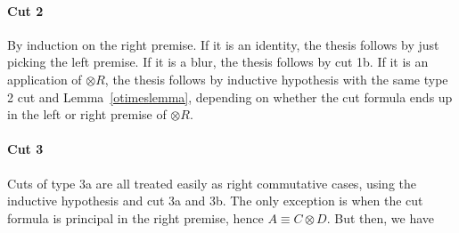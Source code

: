 
\paragraph{Cut 2}

By induction on the right premise. If it is an identity, the thesis follows by
just picking the left premise. If it is a blur, the thesis follows by cut
1b. If it is an application of $\otimes R$, the thesis follows by inductive
hypothesis with the same type 2 cut and Lemma~\ref{otimeslemma}, depending on
whether the cut formula ends up in the left or right premise of $\otimes R$.

\paragraph{Cut 3}

Cuts of type 3a are all treated easily as right commutative cases, using the
inductive hypothesis and cut 3a and 3b. The only exception is when the cut
formula is principal in the right premise, hence $A \equiv C \otimes D$. But
then, we have


